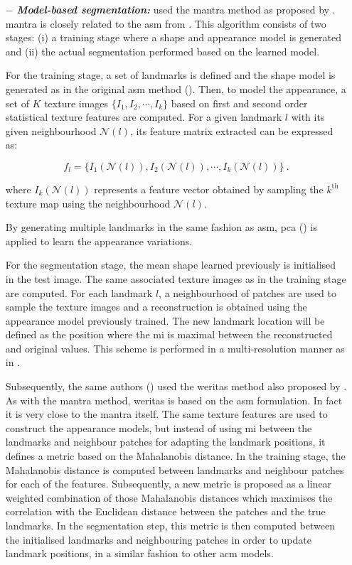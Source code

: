 \begin{enumerate}[leftmargin=*]
\item[$-$] \textbf{\textit{Model-based segmentation:}} \cite{Viswanath2008a,Viswanath2009} used the \ac{mantra} method as proposed by \cite{Toth2008}. \ac{mantra} is closely related to the \ac{asm} from \cite{Cootes1995}. This algorithm consists of two stages: (i) a training stage where a shape and appearance model is generated and (ii) the actual segmentation performed based on the learned model. 

For the training stage, a set of landmarks is defined and the shape model is generated as in the original \ac{asm} method (\cite{Cootes1995}). Then, to model the appearance, a set of $K$ texture images $\{I_1,I_2,\cdots,I_k\}$ based on first and second order statistical texture features are computed. For a given landmark $l$ with its given neighbourhood $\mathcal{N}(l)$, its feature matrix extracted can be expressed as:

\begin{equation}
	f_l = \{ I_1(\mathcal{N}(l)), I_2(\mathcal{N}(l)), \cdots, I_k(\mathcal{N}(l)) \} \ .	
	\label{eq:mantra1}
\end{equation}

\noindent where $I_k(\mathcal{N}(l))$ represents a feature vector obtained by sampling the $k^{\text{th}}$ texture map using the neighbourhood $\mathcal{N}(l)$.

By generating multiple landmarks in the same fashion as \ac{asm}, \ac{pca} (\cite{Pearson1901}) is applied to learn the appearance variations. 

For the segmentation stage, the mean shape learned previously is initialised in the test image. The same associated texture images as in the training stage are computed. For each landmark $l$, a neighbourhood of patches are used to sample the texture images and a reconstruction is obtained using the appearance model previously trained. The new landmark location will be defined as the position where the \ac{mi} is maximal between the reconstructed and original values. This scheme is performed in a multi-resolution manner as in \cite{Cootes1995}.

Subsequently, the same authors (\cite{Viswanath2012}) used the \ac{weritas} method also proposed by \cite{Toth2009}. As with the \ac{mantra} method, \ac{weritas} is based on the \ac{asm} formulation. In fact it is very close to the \ac{mantra} itself. The same texture features are used to construct the appearance models, but instead of using \ac{mi} between the landmarks and neighbour patches for adapting the landmark positions, it defines a metric based on the Mahalanobis distance. In the training stage, the Mahalanobis distance is computed between landmarks and neighbour patches for each of the features. Subsequently, a new metric is proposed as a linear weighted combination of those Mahalanobis distances which maximises the correlation with the Euclidean distance between the patches and the true landmarks. In the segmentation step, this metric is then computed between the initialised landmarks and neighbouring patches in order to update landmark positions, in a similar fashion to other \ac{acm} models. 


\end{enumerate}
